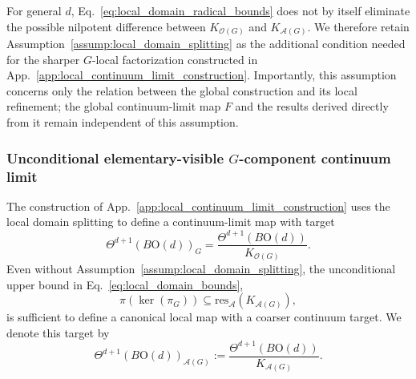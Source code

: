 \documentclass[aps,prx,reprint,superscriptaddress,twocolumn,amsmath,amssymb,amsfonts, nofootinbib]{revtex4-2}
\newcommand{\res}{\text{res}}
\theoremstyle{apsstyle}
\begin{document}
\bigskip 

For general $d$, Eq.~\ref{eq:local_domain_radical_bounds} does not by itself eliminate the possible nilpotent difference between
$K_{\mathcal O(G)}$ and $K_{\mathcal A(G)}$. We therefore retain
Assumption~\ref{assump:local_domain_splitting} as the additional condition needed for the sharper $G$-local factorization constructed in
App.~\ref{app:local_continuum_limit_construction}. Importantly, this assumption concerns only the relation between the global construction and its local refinement; the global continuum-limit map $F$ and the results derived directly from it remain independent of this assumption.

\subsubsection{Unconditional elementary-visible $G$-component continuum limit}
\label{app:elementary_visible_local_limit}

The construction of App.~\ref{app:local_continuum_limit_construction} uses the local domain splitting to define a continuum-limit map with target
\begin{equation*}
    \Theta^{d+1}(B\mathrm{O}(d))_{G}
    =
    \frac{\Theta^{d+1}(B\mathrm{O}(d))}
    {K_{\mathcal O(G)}}.
\end{equation*}
Even without Assumption~\ref{assump:local_domain_splitting}, the unconditional upper bound in Eq.~\ref{eq:local_domain_bounds},
\begin{equation*}
    \pi(\ker(\pi_G))
    \subseteq
    \res_{\mathcal A}(K_{\mathcal A(G)}),
\end{equation*}
is sufficient to define a canonical local map with a coarser continuum target. We denote this target by
\begin{equation}
    \Theta^{d+1}(B\mathrm{O}(d))_{\mathcal A(G)}
    :=
    \frac{\Theta^{d+1}(B\mathrm{O}(d))}
    {K_{\mathcal A(G)}}.
    \label{eq:elementary_visible_continuum_target}
\end{equation}
\end{document}
